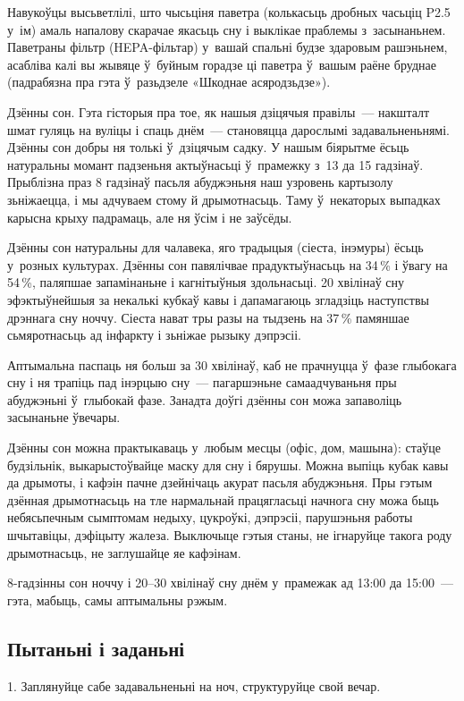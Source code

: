 Навукоўцы высьветлілі, што чысьціня паветра (колькасьць дробных часьціц P2.5 у~ім) амаль напалову скарачае якасьць сну і выклікае праблемы з~засынаньнем. Паветраны фільтр (HEPA-фільтар) у~вашай спальні будзе здаровым рашэньнем, асабліва калі вы жывяце ў~буйным горадзе ці паветра ў~вашым раёне бруднае (падрабязна пра гэта ў~разьдзеле «Шкоднае асяродзьдзе»).

Дзённы сон. Гэта гісторыя пра тое, як нашыя дзіцячыя правілы~--- накшталт шмат гуляць на вуліцы і спаць днём~--- становяцца дарослымі задавальненьнямі. Дзённы сон добры ня толькі ў~дзіцячым садку. У нашым біярытме ёсьць натуральны момант падзеньня актыўнасьці ў~прамежку з~13 да 15 гадзінаў. Прыблізна праз 8 гадзінаў пасьля абуджэньня наш узровень картызолу зьніжаецца, і мы адчуваем стому й дрымотнасьць. Таму ў~некаторых выпадках карысна крыху падрамаць, але ня ўсім і не заўсёды.

Дзённы сон натуральны для чалавека, яго традыцыя (сіеста, інэмуры) ёсьць у~розных культурах. Дзённы сон павялічвае прадуктыўнасьць на 34\,\% і ўвагу на 54\,\%, паляпшае запамінаньне і кагнітыўныя здольнасьці. 20 хвілінаў сну эфэктыўнейшыя за некалькі кубкаў кавы і дапамагаюць згладзіць наступствы дрэннага сну ноччу. Сіеста нават тры разы на тыдзень на 37\,\% памяншае сьмяротнасьць ад інфаркту і зьніжае рызыку дэпрэсіі.

Аптымальна паспаць ня больш за 30 хвілінаў, каб не прачнуцца ў~фазе глыбокага сну і ня трапіць пад інэрцыю сну~--- пагаршэньне самаадчуваньня пры абуджэньні ў~глыбокай фазе. Занадта доўгі дзённы сон можа запаволіць засынаньне ўвечары.

Дзённы сон можна практыкаваць у~любым месцы (офіс, дом, машына): стаўце будзільнік, выкарыстоўвайце маску для сну і бярушы. Можна выпіць кубак кавы да дрымоты, і кафэін пачне дзейнічаць акурат пасьля абуджэньня. Пры гэтым дзённая дрымотнасьць на тле нармальнай працягласьці начнога сну можа быць небясьпечным сымптомам недыху, цукроўкі, дэпрэсіі, парушэньня работы шчытавіцы, дэфіцыту жалеза. Выключыце гэтыя станы, не ігнаруйце такога роду дрымотнасьць, не заглушайце яе кафэінам.

8-гадзінны сон ноччу і 20--30 хвілінаў сну днём у~прамежак ад 13:00 да 15:00~--- гэта, мабыць, самы аптымальны рэжым.

\subsection*{Пытаньні і заданьні}

1. Заплянуйце сабе задавальненьні на ноч, структуруйце свой вечар.

